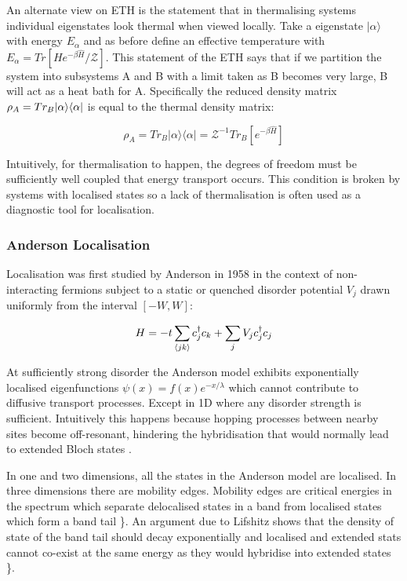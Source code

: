 An alternate view on ETH is the statement that in thermalising systems individual eigenstates look thermal when viewed locally. Take a eigenstate \(|\alpha\rangle\) with energy \(E_\alpha\) and as before define an effective temperature with \(E_\alpha = Tr[H e^{-\beta \hat{H}}/\mathcal{Z}]\). This statement of the ETH says that if we partition the system into subsystems A and B with a limit taken as B becomes very large, B will act as a heat bath for A. Specifically the reduced density matrix \(\rho_A = Tr_B |\alpha\rangle \langle\alpha|\) is equal to the thermal density matrix:

\[\rho_A = Tr_B |\alpha\rangle \langle \alpha| = \mathcal{Z}^{-1} Tr_B [e^{-\beta \hat{H}}] \]

Intuitively, for thermalisation to happen, the degrees of freedom must be sufficiently well coupled that energy transport occurs. This condition is broken by systems with localised states so a lack of thermalisation is often used as a diagnostic tool for localisation.

\hypertarget{anderson-localisation}{%
\subsubsection{Anderson Localisation}\label{anderson-localisation}}

Localisation was first studied by Anderson in 1958 \textcite{andersonAbsenceDiffusionCertain1958} in the context of non-interacting fermions subject to a static or quenched disorder potential \(V_j\) drawn uniformly from the interval \([-W,W]\):

\[
H = -t\sum_{\langle jk \rangle} c^\dagger_j c_k + \sum_j V_j c_j^\dagger c_j
\]

At sufficiently strong disorder the Anderson model exhibits exponentially localised eigenfunctions \(\psi(x) = f(x) e^{-x/\lambda}\) which cannot contribute to diffusive transport processes. Except in 1D where any disorder strength is sufficient. Intuitively this happens because hopping processes between nearby sites become off-resonant, hindering the hybridisation that would normally lead to extended Bloch states \textcite{kramerLocalizationTheoryExperiment1993}.

In one and two dimensions, all the states in the Anderson model are localised. In three dimensions there are mobility edges. Mobility edges are critical energies in the spectrum which separate delocalised states in a band from localised states which form a band tail \textcite{abaninRecentProgressManybody2017}\}. An argument due to Lifshitz shows that the density of state of the band tail should decay exponentially and localised and extended stats cannot co-exist at the same energy as they would hybridise into extended states \textcite{kramerLocalizationTheoryExperiment1993}\}.

